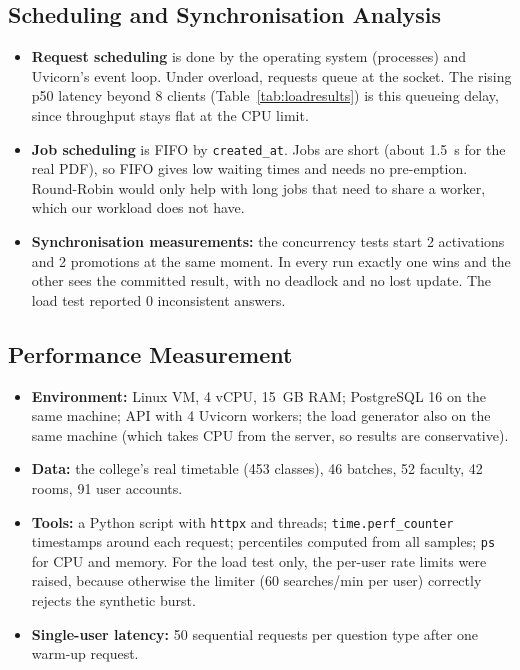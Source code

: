 \subsection{Scheduling and Synchronisation Analysis}
\begin{itemize}
\item \textbf{Request scheduling} is done by the operating system (processes) and Uvicorn's event
      loop. Under overload, requests queue at the socket. The rising p50 latency beyond 8 clients
      (Table~\ref{tab:loadresults}) is this queueing delay, since throughput stays flat at the CPU limit.
\item \textbf{Job scheduling} is FIFO by \texttt{created\_at}. Jobs are short (about 1.5~s for the
      real PDF), so FIFO gives low waiting times and needs no pre-emption. Round-Robin would only help
      with long jobs that need to share a worker, which our workload does not have.
\item \textbf{Synchronisation measurements:} the concurrency tests start 2 activations and 2
      promotions at the same moment. In every run exactly one wins and the other sees the committed
      result, with no deadlock and no lost update. The load test reported 0 inconsistent answers.
\end{itemize}

\subsection{Performance Measurement}
\begin{itemize}
\item \textbf{Environment:} Linux VM, 4 vCPU, 15~GB RAM; PostgreSQL 16 on the same machine; API with
      4 Uvicorn workers; the load generator also on the same machine (which takes CPU from the server,
      so results are conservative).
\item \textbf{Data:} the college's real timetable (453 classes), 46 batches, 52 faculty, 42 rooms,
      91 user accounts.
\item \textbf{Tools:} a Python script with \texttt{httpx} and threads; \texttt{time.perf\_counter}
      timestamps around each request; percentiles computed from all samples; \texttt{ps} for CPU and
      memory. For the load test only, the per-user rate limits were raised, because otherwise the
      limiter (60 searches/min per user) correctly rejects the synthetic burst.
\item \textbf{Single-user latency:} 50 sequential requests per question type after one warm-up request.
\end{itemize}

